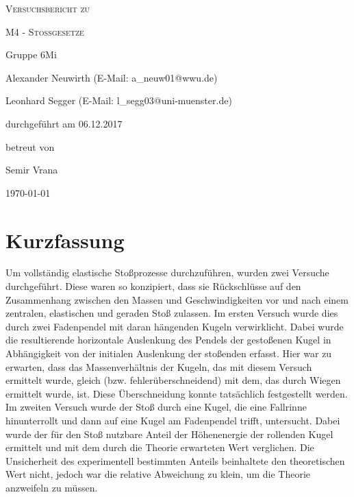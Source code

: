\documentclass[
	a4paper,
	12pt,
	pagesize,
	ngerman
]{scrartcl}
\begin{document}
	
	\begin{titlepage}
		\centering
		{\scshape\LARGE Versuchsbericht zu \par}
		\vspace{1cm}
		{\scshape\huge M4 - Stoßgesetze\par}
		\vspace{2.5cm}
		{\LARGE Gruppe 6Mi \par}
		\vspace{0.5cm}
		
		{\large Alexander Neuwirth (E-Mail: a\_neuw01@wwu.de) \par}
		{\large Leonhard Segger (E-Mail: l\_segg03@uni-muenster.de) \par}
		\vfill
		
		durchgeführt am 06.12.2017\par
		betreut von\par
		{\large Semir Vrana}
		
		\vfill
		
		{\large \today\par}
	\end{titlepage}
	\tableofcontents
	\newpage
	
	\section{Kurzfassung}
	Um vollständig elastische Stoßprozesse durchzuführen, wurden zwei Versuche durchgeführt.
	Diese waren so konzipiert, dass sie Rückschlüsse auf den Zusammenhang zwischen den Massen und Geschwindigkeiten vor und nach einem zentralen, elastischen und geraden Stoß zulassen. 
	Im ersten Versuch wurde dies durch zwei Fadenpendel mit daran hängenden Kugeln verwirklicht.
	Dabei wurde die resultierende horizontale Auslenkung des Pendels der gestoßenen Kugel in Abhängigkeit von der initialen Auslenkung der stoßenden erfasst.
	Hier war zu erwarten, dass das Massenverhältnis der Kugeln, das mit diesem Versuch ermittelt wurde, gleich (bzw. fehlerüberschneidend) mit dem, das durch Wiegen ermittelt wurde, ist.
	Diese Überschneidung konnte tatsächlich festgestellt werden.
	Im zweiten Versuch wurde der Stoß durch eine Kugel, die eine Fallrinne hinunterrollt und dann auf eine Kugel am Fadenpendel trifft, untersucht.
	Dabei wurde der für den Stoß nutzbare Anteil der Höhenenergie der rollenden Kugel ermittelt und mit dem durch die Theorie erwarteten Wert verglichen.
	Die Unsicherheit des experimentell bestimmten Anteils beinhaltete den theoretischen Wert nicht, jedoch war die relative Abweichung zu klein, um die Theorie anzweifeln zu müssen.
	
\end{document}
